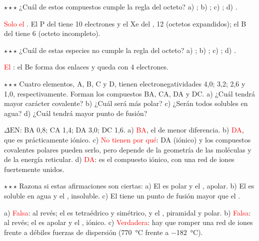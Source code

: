 \begin{exercise}
    \(\star\star\star\) ¿Cuál de estos compuestos cumple la regla del octeto? a) ; b) ; c) ; d) .
    \begin{solu}
        \textcolor{red}{Solo el }. El P del  tiene 10 electrones y el Xe del , 12 (octetos expandidos); el
        B del  tiene 6 (octeto incompleto).
    \end{solu}
\end{exercise}

\begin{exercise}
    \(\star\star\star\) ¿Cuál de estas especies no cumple la regla del octeto? a) ; b) ; c) ;
    d) .
    \begin{solu}
        \textcolor{red}{El }: el Be forma dos enlaces y queda con 4 electrones.
    \end{solu}
\end{exercise}

\begin{exercise}
    \(\star\star\star\) Cuatro elementos, A, B, C y D, tienen electronegatividades 4,0; 3,2; 2,6 y 1,0, respectivamente. Forman
    los compuestos BA, CA, DA y DC. a) ¿Cuál tendrá mayor carácter covalente? b) ¿Cuál será más polar? c) ¿Serán todos solubles en
    agua? d) ¿Cuál tendrá mayor punto de fusión?
    \begin{solu}
        \(\Delta\mathrm{EN}\): BA 0,8; CA 1,4; DA 3,0; DC 1,6. a) \textcolor{red}{BA}, el de menor diferencia. b)
        \textcolor{red}{DA}, que es prácticamente iónico. c) \textcolor{red}{No tienen por qué}: DA (iónico) y los compuestos
        covalentes polares pueden serlo, pero depende de la geometría de las moléculas y de la energía reticular. d)
        \textcolor{red}{DA}: es el compuesto iónico, con una red de iones fuertemente unidos.
    \end{solu}
\end{exercise}

\begin{exercise}
    \(\star\star\star\) Razona si estas afirmaciones son ciertas: a) El  es polar y el , apolar. b) El  es
    soluble en agua y el , insoluble. c) El  tiene un punto de fusión mayor que el .
    \begin{solu}
        a) \textcolor{red}{Falsa}: al revés; el  es tetraédrico y simétrico, y el , piramidal y polar.
        b) \textcolor{red}{Falsa}: al revés; el  es apolar y el , iónico. c) \textcolor{red}{Verdadera}: hay que
        romper una red de iones frente a débiles fuerzas de dispersión (\qty{770}{\degreeCelsius} frente a
        \qty{-182}{\degreeCelsius}).
    \end{solu}
\end{exercise}

